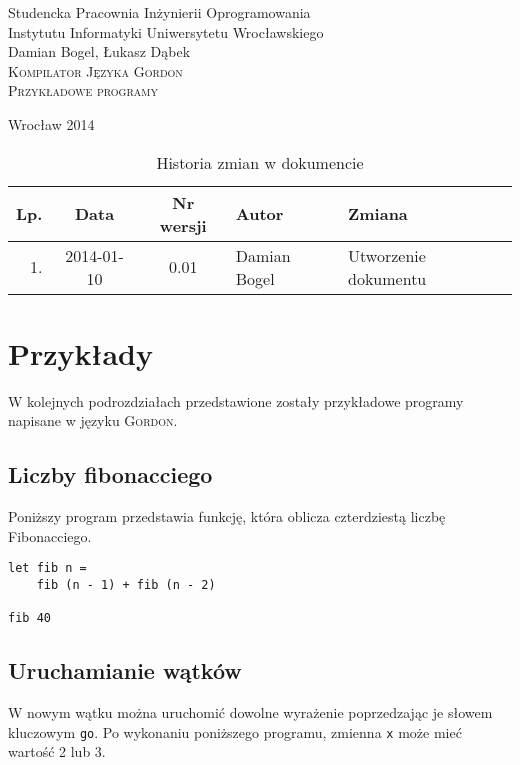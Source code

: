 \documentclass{documentation}
\begin{document}
\begin{titlepage}
\begin{center}
Studencka Pracownia Inżynierii Oprogramowania\\
Instytutu Informatyki Uniwersytetu Wrocławskiego\\[6cm]

Damian Bogel, Łukasz Dąbek\\[1cm]
\textsc{\LARGE Kompilator Języka Gordon}\\[0.5cm]
\textsc{\large Przykładowe programy}

\vfill
Wrocław 2014 \\[2.5cm]

\end{center}
\end{titlepage}

\newpage
\begin{table}
	\centering
    \captionsetup{name=Tabela,labelsep=period}
	\caption{Historia zmian w dokumencie}
		\begin{tabular}{|r|c|c|l|l|}
		\hline
		Lp.  & Data       & Nr wersji & Autor                 & Zmiana \\ \hline
		1.   & 2014-01-10 & 0.01 & Damian Bogel & Utworzenie dokumentu \\ \hline
	\end{tabular}
\end{table}
\newpage

\tableofcontents
\setcounter{page}{2}

\newpage

\section{Przykłady}
\noindent W kolejnych podrozdziałach przedstawione zostały przykładowe programy
napisane w języku \textsc{Gordon}.

\subsection{Liczby fibonacciego}
\noindent Poniższy program przedstawia funkcję, która oblicza czterdziestą
liczbę Fibonacciego.

\begin{verbatim}
let fib n = 
    fib (n - 1) + fib (n - 2)

fib 40
\end{verbatim}

\subsection{Uruchamianie wątków}
\noindent W nowym wątku można uruchomić dowolne wyrażenie poprzedzając je słowem kluczowym
\texttt{go}. Po wykonaniu poniższego programu, zmienna \texttt{x} może mieć wartość 2 lub 3.
\end{document}
